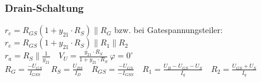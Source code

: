     \subsubsection{Drain-Schaltung}
        $r_e=R_{GS}(1+y_{21}\cdot R_S)\parallel R_G$ bzw. bei Gatespannungsteiler: $r_e=R_{GS}(1+y_{21}\cdot R_S)\parallel R_1\parallel R_2$ \\
        $r_a=R_S\parallel \frac{1}{y_{21}}\quad V_U=\frac{y_{21}\cdot R_S}{1+y_{21}\cdot R_S}\: \varphi=0^{\circ}$ \\ %
        $R_G=\frac{-U_{GS}}{I_{GSS}}\quad
        R_S=\frac{U_{RS}}{I_D}\quad
        R_{GS}=\frac{-U_{GS}}{-I_{GSS}}\quad
        R_1=\frac{U_B-U_{GS}-U_S}{I_q}\quad
        R_2=\frac{U_{GS}+U_S}{I_q}$ %
